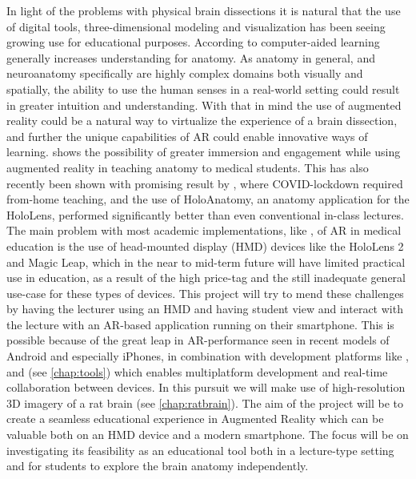 In light of the problems with physical brain dissections it is natural that the use of digital tools, three-dimensional modeling and visualization has been seeing growing use for educational purposes. 
According to \citep{Dalgarno2010} computer-aided learning generally increases understanding for anatomy. As anatomy in general, and neuroanatomy specifically are highly complex domains both visually and spatially, the ability to use the human senses in a real-world setting could result in greater intuition and understanding. With that in mind the use of augmented reality could be a natural way to virtualize the experience of a brain dissection, and further the unique capabilities of AR could enable innovative ways of learning. \citep{Moro2017} shows the possibility of greater immersion and engagement while using augmented reality in teaching anatomy to medical students. This has also recently been shown with promising result by  \citep{Wish2020}, where COVID-lockdown required from-home teaching, and the use of HoloAnatomy, an anatomy application for the HoloLens, performed significantly better than even conventional in-class lectures.
The main problem with most academic implementations, like \citep{Wish2020}, of AR in medical education is the use of head-mounted display (HMD) devices like the HoloLens 2 and Magic Leap, which in the near to mid-term future will have limited practical use in education, as a result of the high price-tag and the still inadequate general use-case for these types of devices.
This project will try to mend these challenges by having the lecturer using an HMD and having student view and interact with the lecture with an AR-based application running on their smartphone. 
This is possible because of the great leap in AR-performance seen in recent models of Android and especially iPhones, in combination with development platforms like ,  and  (see \autoref{chap:tools}) which enables multiplatform development and real-time collaboration between devices. In this pursuit we will make use of high-resolution 3D imagery of a rat brain (see \autoref{chap:ratbrain}).  
The aim of the project will be to create a seamless educational experience in Augmented Reality which can be valuable both on an HMD device and a modern smartphone. The focus will be on investigating its feasibility as an educational tool both in a lecture-type setting and for students to explore the brain anatomy independently. 

